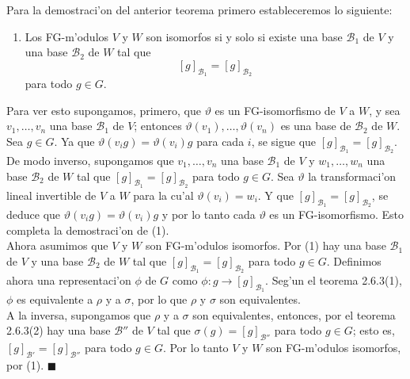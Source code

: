 \documentclass[a4paper,openright,12pt]{book}
\numberwithin{equation}{section} %
\newenvironment{proof}{\noindent{\it Demostracion:}}{\hfill$\blacksquare$} %
\begin{document}
\begin{proof}
Para la demostraci'on del anterior teorema primero estableceremos lo siguiente:
\begin{enumerate}
\item Los FG-m'odulos $V$ y $W$ son isomorfos si y solo si existe una base $\mathscr{B}_{1}$ de $V$ y una base $\mathscr{B}_{2}$ de $W$ tal que
\[
[g]_{\mathscr{B}_{1}}=[g]_{\mathscr{B}_{2}}
\]
para todo $g \in G$.
\end{enumerate}
Para ver esto supongamos, primero, que $\vartheta$ es un FG-isomorfismo de $V$ a $W$, y sea $v_{1}, \ldots ,v_{n}$ una base $\mathscr{B}_{1}$ de $V$; entonces $\vartheta (v_{1}), \ldots ,\vartheta (v_{n})$ es una base de $\mathscr{B}_{2}$ de $W$. Sea $g \in G$. Ya que $\vartheta (v_{i}g)=\vartheta (v_{i})g$ para cada $i$, se sigue que $[g]_{\mathscr{B}_{1}}=[g]_{\mathscr{B}_{2}}$.\\
De modo inverso, supongamos que $v_{1}, \ldots ,v_{n}$ una base $\mathscr{B}_{1}$ de $V$ y $w_{1}, \ldots ,w_{n}$ una base $\mathscr{B}_{2}$ de $W$ tal que $[g]_{\mathscr{B}_{1}}=[g]_{\mathscr{B}_{2}}$ para todo $g \in G$. Sea $\vartheta$ la transformaci'on lineal invertible de $V$ a $W$ para la cu'al $\vartheta (v_{i})=w_{i}$. Y que $[g]_{\mathscr{B}_{1}}=[g]_{\mathscr{B}_{2}}$, se deduce que $\vartheta (v_{i}g)=\vartheta (v_{i})g$ y por lo tanto cada $\vartheta$ es un FG-isomorfismo. Esto completa la demostraci'on de (1).\\
Ahora asumimos que $V$ y $W$ son FG-m'odulos isomorfos. Por (1) hay una base $\mathscr{B}_{1}$ de $V$ y una base $\mathscr{B}_{2}$ de $W$ tal que $[g]_{\mathscr{B}_{1}}=[g]_{\mathscr{B}_{2}}$ para todo $g \in G$. Definimos ahora una representaci'on $\phi$ de $G$ como $\phi : g \rightarrow [g]_{\mathscr{B}_{1}}$. Seg'un el teorema 2.6.3(1), $\phi$ es equivalente a $\rho$ y a $\sigma$, por lo que $\rho$ y $\sigma$ son equivalentes.\\
A la inversa, supongamos que $\rho$ y a $\sigma$ son equivalentes, entonces, por el teorema 2.6.3(2) hay una base $\mathscr{B''}$ de $V$ tal que $\sigma (g) = [g]_{\mathscr{B''}}$ para todo $g \in G$; esto es, $[g]_{\mathscr{B'}}=[g]_{\mathscr{B''}}$  para todo $g \in G$. Por lo tanto $V$ y $W$ son FG-m'odulos isomorfos, por (1).
\end{proof}
\end{document}
